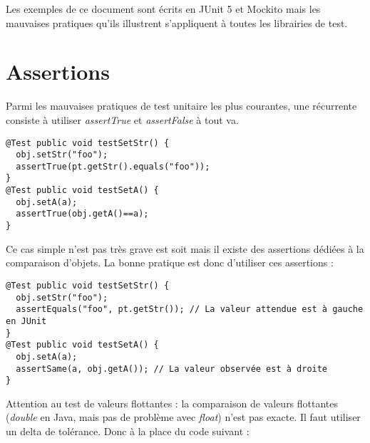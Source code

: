 \documentclass{article}
\title{\vspace*{-3cm}{\huge Mauvaises pratiques dans l'écriture de tests}}
\author{Arnaud Blouin}
\date{}
\newcommand{\Bad}{\vspace*{-0.15cm}\noindent{\huge \fontspec{DejaVu Sans} ☹\\😱}}
\newcommand{\Good}{\vspace*{-0.15cm}\noindent{\huge \fontspec{DejaVu Sans} 😃\\😍} }
\begin{document}
\maketitle

Les exemples de ce document sont écrits en JUnit 5 et Mockito mais les mauvaises pratiques qu'ils illustrent s'appliquent à toutes les librairies de test.


\section*{Assertions}

Parmi les mauvaises pratiques de test unitaire les plus courantes, une récurrente consiste à utiliser \emph{assertTrue} et \emph{assertFalse} à tout va.

\medskip
\begin{minipage}{0.07\textwidth}
\Bad
\end{minipage}%
\begin{minipage}{0.9\textwidth}
\begin{lstlisting}[language=MyJava]
@Test public void testSetStr() {
  obj.setStr("foo");
  assertTrue(pt.getStr().equals("foo"));
}
@Test public void testSetA() {
  obj.setA(a);
  assertTrue(obj.getA()==a);
}
\end{lstlisting}   
\end{minipage}

Ce cas simple n'est pas très grave est soit mais il existe des assertions dédiées à la comparaison d'objets. 
La bonne pratique est donc d'utiliser ces assertions :

\medskip
\begin{minipage}{0.07\textwidth}
\Good
\end{minipage}%
\begin{minipage}{0.9\textwidth}
\begin{lstlisting}[language=MyJava]
@Test public void testSetStr() {
  obj.setStr("foo");
  assertEquals("foo", pt.getStr()); // La valeur attendue est à gauche en JUnit
}
@Test public void testSetA() {
  obj.setA(a);
  assertSame(a, obj.getA()); // La valeur observée est à droite
}
\end{lstlisting}   
\end{minipage}

Attention au test de valeurs flottantes :
la comparaison de valeurs flottantes (\emph{double} en Java, mais pas de problème avec \emph{float}) n'est pas exacte.
Il faut utiliser un delta de tolérance.
Donc à la place du code suivant :
\end{document}
